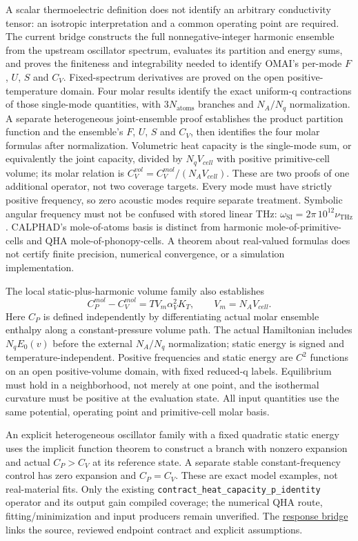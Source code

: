 \documentclass[11pt,a4paper]{article}
\begin{document}
A scalar thermoelectric definition does not identify an arbitrary conductivity
tensor: an isotropic interpretation and a common operating point are required.
The current bridge constructs the full nonnegative-integer harmonic ensemble
from the upstream oscillator spectrum, evaluates its partition and energy sums,
and proves the finiteness and integrability needed to identify OMAI's per-mode
$F$, $U$, $S$ and $C_V$. Fixed-spectrum derivatives are proved on the open
positive-temperature domain. Four molar results identify the exact uniform-q
contractions of those single-mode quantities, with $3N_{\mathrm{atoms}}$
branches and $N_A/N_q$ normalization. A separate heterogeneous joint-ensemble
proof establishes the product partition function and the ensemble's $F$, $U$,
$S$ and $C_V$, then identifies the four molar formulas after normalization.
Volumetric heat capacity is the
single-mode sum, or equivalently the joint capacity, divided by $N_q V_{cell}$
with positive primitive-cell volume; its molar relation is
$C_V^{vol}=C_V^{mol}/(N_A V_{cell})$. These are two proofs of one additional
operator, not two coverage targets. Every mode must have strictly positive
frequency, so zero acoustic modes require separate treatment. Symbolic angular frequency must not be confused
with stored linear THz: $\omega_{\mathrm{SI}}=2\pi\,10^{12}\nu_{\mathrm{THz}}$.
CALPHAD's mole-of-atoms basis is distinct from harmonic mole-of-primitive-cells
and QHA mole-of-phonopy-cells. A theorem about real-valued formulas does not
certify finite precision, numerical convergence, or a simulation implementation.

The local static-plus-harmonic volume family also establishes
\[
  C_P^{mol}-C_V^{mol}=T V_m\alpha_V^2 K_T,\qquad V_m=N_A V_{cell}.
\]
Here $C_P$ is defined independently by differentiating actual molar ensemble
enthalpy along a constant-pressure volume path. The actual Hamiltonian includes
$N_q E_0(v)$ before the external $N_A/N_q$ normalization; static energy is signed
and temperature-independent. Positive frequencies and static energy are $C^2$
functions on an open positive-volume domain, with fixed reduced-q labels.
Equilibrium must hold in a neighborhood, not merely at one point, and the
isothermal curvature must be positive at the evaluation state. All input
quantities use the same potential, operating point and primitive-cell molar basis.

An explicit heterogeneous oscillator family with a fixed quadratic static
energy uses the implicit function theorem to construct a branch with nonzero
expansion and actual $C_P>C_V$ at its reference state. A separate stable
constant-frequency control has zero expansion and $C_P=C_V$. These are exact
model examples, not real-material fits. Only the existing
\texttt{contract\_heat\_capacity\_p\_identity} operator and its output gain compiled
coverage; the numerical QHA route, fitting/minimization and input producers
remain unverified. The \href{https://openmaterials.ai/lean/bridge/\#response}{response bridge}
links the source, reviewed endpoint contract and explicit assumptions.
\end{document}
